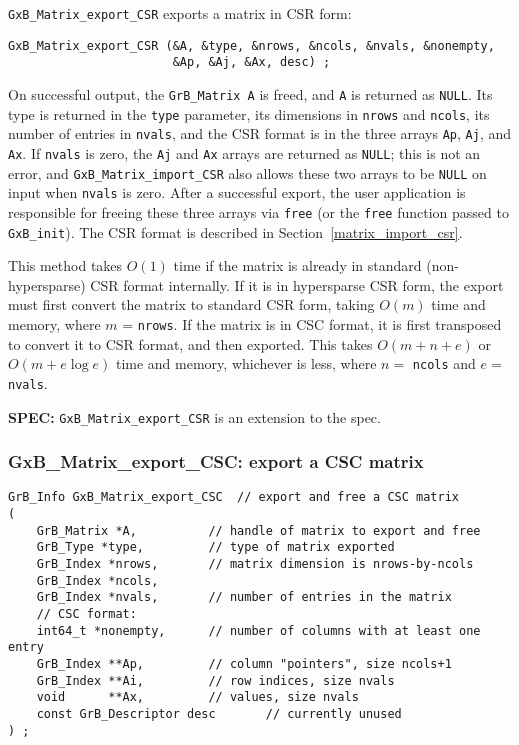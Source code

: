 \documentclass[12pt]{article}
\begin{document}
\verb'GxB_Matrix_export_CSR' exports a matrix in CSR form:

{\footnotesize
\begin{verbatim}
GxB_Matrix_export_CSR (&A, &type, &nrows, &ncols, &nvals, &nonempty,
                       &Ap, &Aj, &Ax, desc) ;
\end{verbatim}}

On successful output, the \verb'GrB_Matrix A' is freed, and \verb'A' is
returned as \verb'NULL'.  Its type is returned in the \verb'type' parameter,
its dimensions in \verb'nrows' and \verb'ncols', its number of entries in
\verb'nvals', and the CSR format is in the three arrays \verb'Ap', \verb'Aj',
and \verb'Ax'.  If \verb'nvals' is zero, the \verb'Aj' and \verb'Ax' arrays are
returned as \verb'NULL'; this is not an error, and \verb'GxB_Matrix_import_CSR'
also allows these two arrays to be \verb'NULL' on input when \verb'nvals' is
zero.  After a successful export, the user application is responsible for
freeing these three arrays via \verb'free' (or the \verb'free' function passed to \verb'GxB_init').  The CSR format is
described in Section~\ref{matrix_import_csr}.

This method takes $O(1)$ time if the matrix is already in standard
(non-hypersparse) CSR format internally.  If it is in hypersparse CSR form, the
export must first convert the matrix to standard CSR form, taking $O(m)$ time
and memory, where $m$ = \verb'nrows'.  If the matrix is in CSC format, it is
first transposed to convert it to CSR format, and then exported.  This takes
$O(m+n+e)$ or $O(m+e \log e)$ time and memory, whichever is less, where $n=$
\verb'ncols' and $e=$ \verb'nvals'.

\begin{spec}
{\bf SPEC:} \verb'GxB_Matrix_export_CSR' is an extension to the spec.
\end{spec}

\newpage
\subsubsection{{\sf GxB\_Matrix\_export\_CSC:} export a CSC matrix}
\label{matrix_export_csc}

\begin{mdframed}[userdefinedwidth=6in]
{\footnotesize
\begin{verbatim}
GrB_Info GxB_Matrix_export_CSC  // export and free a CSC matrix
(
    GrB_Matrix *A,          // handle of matrix to export and free
    GrB_Type *type,         // type of matrix exported
    GrB_Index *nrows,       // matrix dimension is nrows-by-ncols
    GrB_Index *ncols,
    GrB_Index *nvals,       // number of entries in the matrix
    // CSC format:
    int64_t *nonempty,      // number of columns with at least one entry
    GrB_Index **Ap,         // column "pointers", size ncols+1
    GrB_Index **Ai,         // row indices, size nvals
    void      **Ax,         // values, size nvals
    const GrB_Descriptor desc       // currently unused
) ;
\end{verbatim}
} \end{mdframed}
\end{document}
